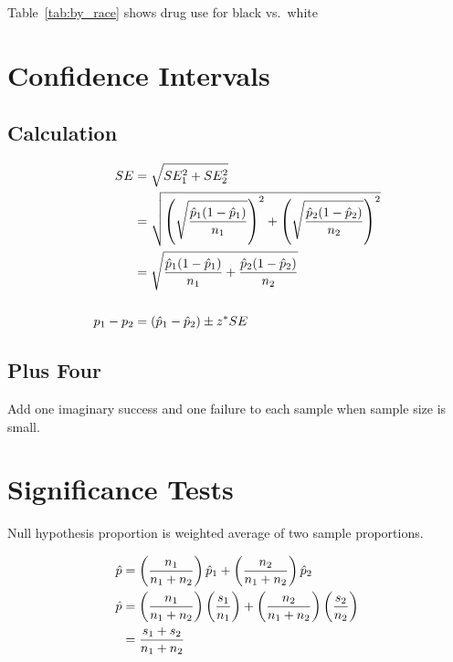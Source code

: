 \documentclass[letterpaper, landscape]{exam}
\begin{document}
  Table~\ref{tab:by_race} shows drug use for black vs.\ white

  \section{Confidence Intervals} %

  \subsection{Calculation} %
  
  \begin{align*}
    SE & = \sqrt{ SE_1^2 + SE_2^2 } \\
       & = \sqrt{ \del{ \sqrt{ \frac{\hat{p}_1 ( 1 - \hat{p}_1 )}{ n_1 } } }^2
                + \del{ \sqrt{ \frac{\hat{p}_2 ( 1 - \hat{p}_2 )}{ n_2 } } }^2} \\
       & = \sqrt{ \frac{\hat{p}_1 ( 1 - \hat{p}_1 )}{ n_1 } 
                + \frac{\hat{p}_2 ( 1 - \hat{p}_2 )}{ n_2 } } \\
    \\
    p_1 - p_2 & = (\hat{p}_1 - \hat{p}_2) \pm z^* SE \\
  \end{align*}

  \subsection{Plus Four} %

  Add one imaginary success and one failure to each sample when sample size is small.
  
  \section{Significance Tests} %

  Null hypothesis proportion is weighted average of two sample proportions.

  \begin{align*}
    \hat{p} &= \del{ \frac{n_1}{n_1 + n_2} } \hat{p}_1 
             + \del{ \frac{n_2}{n_1 + n_2} } \hat{p}_2 \\
    \hat{p} &= \del{ \frac{n_1}{n_1 + n_2} } \del{ \frac{s_1}{n_1} } 
             + \del{ \frac{n_2}{n_1 + n_2} } \del{ \frac{s_2}{n_2} } \\
            & = \frac{s_1 + s_2}{n_1 + n_2} \\
  \end{align*}
\end{document}
